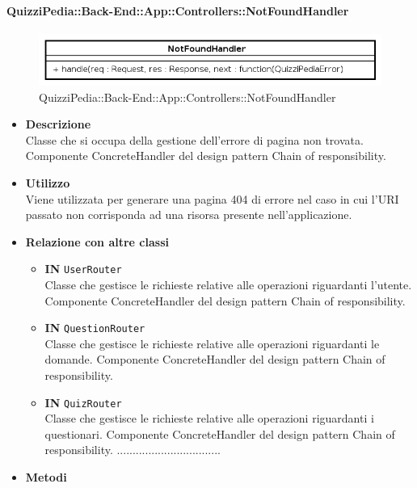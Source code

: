\paragraph{QuizziPedia::Back-End::App::Controllers::NotFoundHandler}
\label{QuizziPedia::Back-End::App::Controllers::NotFoundHandler}
\begin{figure}[ht]
	\centering
	\includegraphics[scale=0.45]{UML/Package/QuizziPedia_Back-End_App_Controllers_notFoundHandler.png}
	\caption{QuizziPedia::Back-End::App::Controllers::NotFoundHandler}
\end{figure}
\FloatBarrier
\begin{itemize}
	\item \textbf{Descrizione}\\
	Classe che si occupa della gestione dell'errore di pagina non trovata. Componente ConcreteHandler del design pattern Chain of responsibility.
	\item \textbf{Utilizzo}\\
	Viene utilizzata per generare una pagina 404 di errore nel caso in cui l'URI passato non corrisponda ad una risorsa presente nell'applicazione.
	\item \textbf{Relazione con altre classi}\\
	\begin{itemize}
		\item \textbf{IN} \texttt{UserRouter}\\
		Classe che gestisce le richieste relative alle operazioni riguardanti l'utente. Componente ConcreteHandler del design pattern Chain of responsibility.
		\item \textbf{IN} \texttt{QuestionRouter}\\
		Classe che gestisce le richieste relative alle operazioni riguardanti le domande. Componente ConcreteHandler del design pattern Chain of responsibility.
		\item \textbf{IN} \texttt{QuizRouter}\\
		Classe che gestisce le richieste relative alle operazioni riguardanti i questionari. Componente ConcreteHandler del design pattern Chain of responsibility.
		.................................
	\end{itemize}
	\item \textbf{Metodi}\\

\end{itemize}
